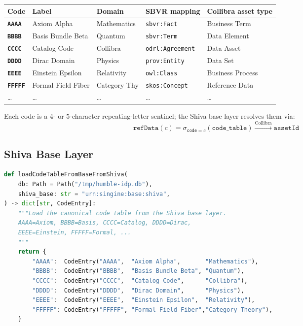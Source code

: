 \documentclass[12pt,a4paper]{article}
\newcommand{\Ctable}[1]{\texttt{\textbf{#1}}}
\begin{document}
\begin{center}
\begin{tabular}{@{}lllll@{}}
\toprule
\textbf{Code} & \textbf{Label} & \textbf{Domain} & \textbf{SBVR mapping} & \textbf{Collibra asset type}\\
\midrule
\Ctable{AAAA} & Axiom Alpha         & Mathematics   & \texttt{sbvr:Fact}        & Business Term \\
\Ctable{BBBB} & Basis Bundle Beta   & Quantum       & \texttt{sbvr:Term}        & Data Element  \\
\Ctable{CCCC} & Catalog Code        & Collibra      & \texttt{odrl:Agreement}   & Data Asset    \\
\Ctable{DDDD} & Dirac Domain        & Physics       & \texttt{prov:Entity}      & Data Set      \\
\Ctable{EEEE} & Einstein Epsilon    & Relativity    & \texttt{owl:Class}        & Business Process \\
\Ctable{FFFFF} & Formal Field Fiber & Category Thy  & \texttt{skos:Concept}     & Reference Data \\
\ldots & \ldots              & \ldots        & \ldots                    & \ldots \\
\bottomrule
\end{tabular}
\end{center}

Each code is a 4- or 5-character repeating-letter sentinel; the Shiva
base layer resolves them via:
\[
  \texttt{refData}(c) = \sigma_{\texttt{code} = c}(\texttt{code\_table})
  \xrightarrow{\text{Collibra}} \texttt{assetId}
\]

\subsection{Shiva Base Layer}

\begin{lstlisting}[language=Python, caption={loadCodeTableFromBaseFromShiva()}]
def loadCodeTableFromBaseFromShiva(
    db: Path = Path("/tmp/humble-idp.db"),
    shiva_base: str = "urn:singine:base:shiva",
) -> dict[str, CodeEntry]:
    """Load the canonical code table from the Shiva base layer.
    AAAA=Axiom, BBBB=Basis, CCCC=Catalog, DDDD=Dirac,
    EEEE=Einstein, FFFFF=Formal, ...
    """
    return {
        "AAAA":  CodeEntry("AAAA",  "Axiom Alpha",       "Mathematics"),
        "BBBB":  CodeEntry("BBBB",  "Basis Bundle Beta", "Quantum"),
        "CCCC":  CodeEntry("CCCC",  "Catalog Code",      "Collibra"),
        "DDDD":  CodeEntry("DDDD",  "Dirac Domain",      "Physics"),
        "EEEE":  CodeEntry("EEEE",  "Einstein Epsilon",  "Relativity"),
        "FFFFF": CodeEntry("FFFFF", "Formal Field Fiber","Category Theory"),
    }
\end{lstlisting}
\end{document}
